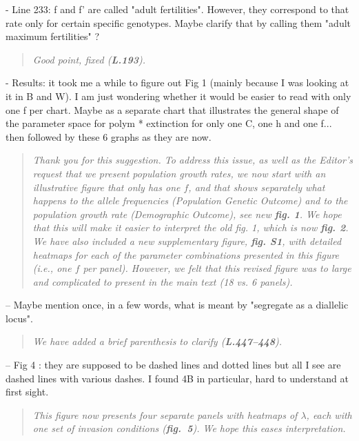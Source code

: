 \documentclass[11pt]{article}
\begin{document}
- Line 233: f and f’ are called "adult fertilities". However, they correspond to that rate only for certain specific genotypes. Maybe clarify that by calling them "adult maximum fertilities" ?

\begin{quote}
	{\itshape Good point, fixed ({\bf L.193}).}
\end{quote}

- Results: it took me a while to figure out Fig 1 (mainly because I was looking at it in B and W). I am just wondering whether it would be easier to read with only one f per chart. Maybe as a separate chart that illustrates the general shape of the parameter space for polym * extinction for only one C, one h and one f... then followed by these 6 graphs as they are now.

\begin{quote}
	{\itshape Thank you for this suggestion. To address this issue, as well as the Editor's request that we present population growth rates, we now start with an illustrative figure that only has one $f$, and that shows separately what happens to the allele frequencies (Population Genetic Outcome) and to the population growth rate (Demographic Outcome), see new {\bf fig. 1}. We hope that this will make it easier to interpret the old fig. 1, which is now {\bf fig. 2}. We have also included a new supplementary figure, {\bf fig. S1}, with detailed heatmaps for each of the parameter combinations presented in this figure (i.e., one $f$ per panel). However, we felt that this revised figure was to large and complicated to present in the main text (18 vs. 6 panels).}
\end{quote}

\noindent-- Maybe mention once, in a few words, what is meant by "segregate as a diallelic locus".
\begin{quote}
	{\itshape We have added a brief parenthesis to clarify ({\bf L.447--448}).}
\end{quote}

\noindent-- Fig 4 : they are supposed to be dashed lines and dotted lines but all I see are dashed lines with various dashes. I found 4B in particular, hard to understand at first sight.

\begin{quote}
	{\itshape This figure now presents four separate panels with heatmaps of $\lambda$, each with one set of invasion conditions ({\bf fig.~5}). We hope this eases interpretation.}
\end{quote}
\bigskip
\end{document}
